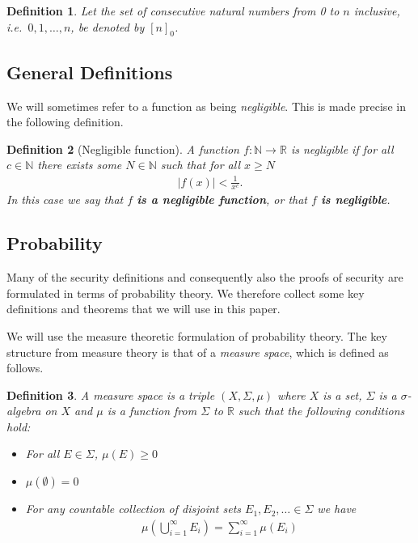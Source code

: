 \documentclass{article}
\newcommand\paper{paper}
\newcommand{\seqZ}[1]{\left[#1\right]_0}
\newtheorem{definition}{Definition}
\theoremstyle{remark}
\newcommand{\N}{\mathbb{N}}
\begin{document}
\begin{definition}
	Let the set of consecutive natural numbers from 0 to $n$ inclusive, i.e.\
	$0, 1, \ldots, n$, be denoted by $\seqZ{n}$.
\end{definition}

\subsection{General Definitions}

We will sometimes refer to a function as being \textit{negligible}. This is
made precise in the following definition.
\begin{definition}[Negligible function]
	A function $f: \N \to \mathbb{R}$ is negligible if for all $c \in \N$ there
	exists some $N \in \N$ such that for all $x \ge N$
	\begin{align*}
		|f(x)| < \frac{1}{x^c}.
	\end{align*}
	In this case we say that $f$ \textbf{is a negligible function}, or that $f$
	\textbf{is negligible}.
\end{definition}

\subsection{Probability}

Many of the security definitions and consequently also the proofs of security
are formulated in terms of probability theory. We therefore collect some key
definitions and theorems that we will use in this \paper{}.

We will use the measure theoretic formulation of probability theory. The key
structure from measure theory is that of a \textit{measure space}, which is
defined as follows.

\begin{definition}
	A measure space is a triple $(X, \Sigma, \mu)$ where $X$ is a set, $\Sigma$
	is a $\sigma$-algebra on $X$ and $\mu$ is a function from $\Sigma$ to
	$\mathbb{R}$ such that the following conditions hold:
	\begin{itemize}
		\item For all $E \in \Sigma$, $\mu(E) \ge 0$
		\item $\mu(\emptyset) = 0$
		\item For any countable collection of disjoint sets $E_1, E_2, \ldots
			\in \Sigma$ we have
			\begin{align*}
				\mu\left(\bigcup_{i=1}^\infty E_i\right) =
				\sum_{i=1}^\infty \mu(E_i)
			\end{align*}
	\end{itemize}
\end{definition}
\end{document}
